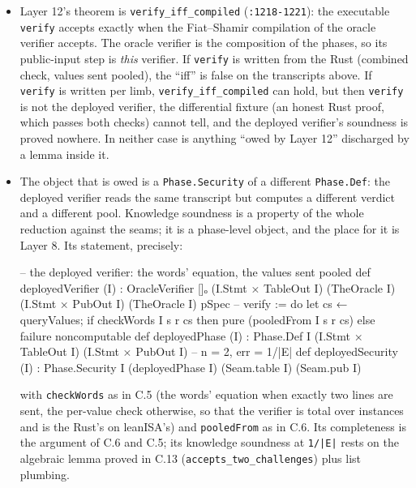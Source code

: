 \begin{itemize}
\item Layer 12's theorem is \texttt{verify\_\allowbreak{}iff\_\allowbreak{}compiled} (\texttt{:1218-{}1221}): the executable \texttt{verify} accepts exactly when the Fiat–Shamir compilation of the oracle verifier accepts. The oracle verifier is the composition of the phases, so its public-input step is \emph{this} verifier. If \texttt{verify} is written from the Rust (combined check, values sent pooled), the \enquote{iff} is false on the transcripts above. If \texttt{verify} is written per limb, \texttt{verify\_\allowbreak{}iff\_\allowbreak{}compiled} can hold, but then \texttt{verify} is not the deployed verifier, the differential fixture (an honest Rust proof, which passes both checks) cannot tell, and the deployed verifier's soundness is proved nowhere. In neither case is anything \enquote{owed by Layer 12} discharged by a lemma inside it.
\item The object that is owed is a \texttt{Phase.\allowbreak{}Security} of a different \texttt{Phase.\allowbreak{}Def}: the deployed verifier reads the same transcript but computes a different verdict and a different pool. Knowledge soundness is a property of the whole reduction against the seams; it is a phase-level object, and the place for it is Layer 8. Its statement, precisely:

\begin{leancode}
-- the deployed verifier: the words' equation, the values sent pooled
def deployedVerifier (I) : OracleVerifier []ₒ (I.Stmt × TableOut I) (TheOracle I) (I.Stmt × PubOut I) (TheOracle I) pSpec
    -- verify := do let cs ← queryValues; if checkWords I s r cs then pure (pooledFrom I s r cs) else failure
noncomputable def deployedPhase (I) : Phase.Def I (I.Stmt × TableOut I) (I.Stmt × PubOut I)   -- n = 2, err = 1/|E|
def deployedSecurity (I) : Phase.Security I (deployedPhase I) (Seam.table I) (Seam.pub I)
\end{leancode}

with \texttt{checkWords} as in C.5 (the words' equation when exactly two lines are sent, the per-value check otherwise, so that the verifier is total over instances and is the Rust's on leanISA's) and \texttt{pooledFrom} as in C.6. Its completeness is the argument of C.6 and C.5; its knowledge soundness at \texttt{1/\allowbreak{}|E|} rests on the algebraic lemma proved in C.13 (\texttt{accepts\_\allowbreak{}two\_\allowbreak{}challenges}) plus list plumbing.
\end{itemize}

